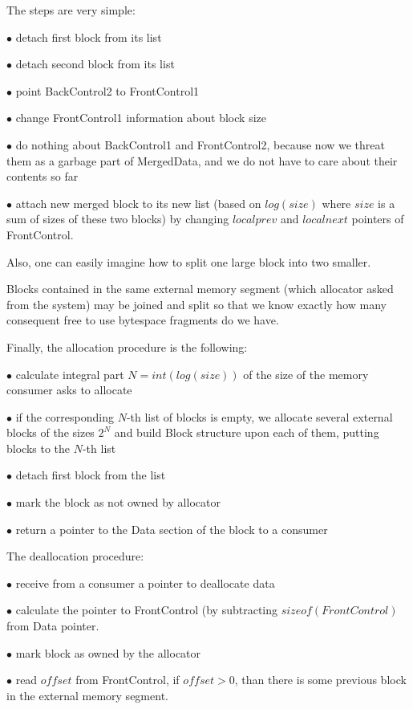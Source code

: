 \documentclass{article}
\begin{document}
The steps are very simple:

$\bullet$ detach first block from its list

$\bullet$ detach second block from its list

$\bullet$ point BackControl2 to FrontControl1

$\bullet$ change FrontControl1 information about block size

$\bullet$ do nothing about BackControl1 and FrontControl2, because now we threat them as a garbage part of MergedData, and we do not have to care about their contents so far

$\bullet$ attach new merged block to its new list (based on $log(size)$ where $size$ is a sum of sizes of these two blocks) by changing $localprev$ and $localnext$ pointers of FrontControl.

\smallskip

Also, one can easily imagine how to split one large block into two smaller.

\smallskip

Blocks contained in the same external memory segment (which allocator asked from the system) may be joined and split so that we know exactly how many consequent free to use bytespace fragments do we have.
\smallskip

Finally, the allocation procedure is the following:

$\bullet$ calculate integral part $N = int(log(size))$ of the size of the memory consumer asks to allocate

$\bullet$ if the corresponding $N$-th list of blocks is empty, we allocate several external blocks of the sizes $2^{N}$ and build Block structure upon each of them, putting blocks to the $N$-th list

$\bullet$ detach first block from the list

$\bullet$ mark the block as not owned by allocator

$\bullet$ return a pointer to the Data section of the block to a consumer

\smallskip

The deallocation procedure:

$\bullet$ receive from a consumer a pointer to deallocate data

$\bullet$ calculate the pointer to FrontControl (by subtracting $sizeof(FrontControl)$ from Data pointer.

$\bullet$ mark block as owned by the allocator

$\bullet$ read $offset$ from FrontControl, if $offset > 0$, than there is some previous block in the external memory segment.
\end{document}
